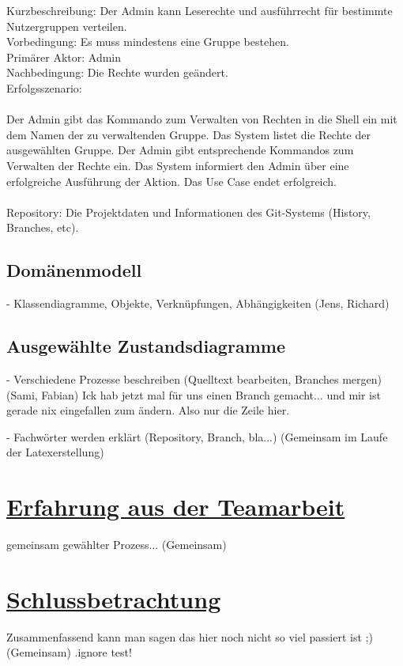 \documentclass[a4paper]{article}
\begin{document}
Kurzbeschreibung: 	Der Admin kann Leserechte und ausführrecht für bestimmte Nutzergruppen verteilen.\\
Vorbedingung:	Es muss mindestens eine Gruppe bestehen. \\
Primärer Aktor:	Admin\\
Nachbedingung:	Die Rechte wurden geändert. \\
Erfolgsszenario:\\
\\
Der Admin gibt das Kommando zum Verwalten von Rechten in die Shell ein mit dem Namen der zu verwaltenden Gruppe. Das System listet die Rechte der ausgewählten Gruppe. Der Admin gibt entsprechende Kommandos zum Verwalten der Rechte ein. Das System informiert den Admin über eine erfolgreiche Ausführung der Aktion. Das Use Case endet erfolgreich.\\
\\

Repository: Die Projektdaten und Informationen des Git-Systems (History, Branches, etc).
\newpage	
\subsection{Domänenmodell}

	  - Klassendiagramme, Objekte, Verknüpfungen, Abhängigkeiten (Jens, Richard)
\newpage		
\subsection{Ausgewählte Zustandsdiagramme}

	 - Verschiedene Prozesse beschreiben (Quelltext bearbeiten, Branches mergen) (Sami, Fabian)
	 Ick hab jetzt mal für uns einen Branch gemacht... und mir ist gerade nix eingefallen zum ändern.
	 Also nur die Zeile hier.
\newpage	

\printglossary[title={Glossar}, numberedsection]

	 - Fachwörter werden erklärt (Repository, Branch, bla...) (Gemeinsam im Laufe der Latexerstellung) 
\newpage		
\section{\underline{Erfahrung aus der Teamarbeit}}

	gemeinsam gewählter Prozess...
	(Gemeinsam)

\section{\underline{Schlussbetrachtung}}
	
	Zusammenfassend kann man sagen das hier noch nicht so viel passiert ist ;)	
	(Gemeinsam)
	.ignore test!
	
\end{document}
